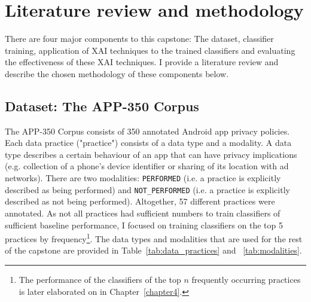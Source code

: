 \chapter{Literature review and methodology} %
\label{chapter2} %

\newcommand{\keyword}[1]{\textbf{#1}}
\newcommand{\tabhead}[1]{\textbf{#1}}
\newcommand{\code}[1]{\texttt{#1}}
\newcommand{\file}[1]{\texttt{\bfseries#1}}
\newcommand{\option}[1]{\texttt{\itshape#1}}


There are four major components to this capstone: The dataset, classifier training, application of XAI techniques to the trained classifiers and evaluating the effectiveness of these XAI techniques. I provide a literature review and describe the chosen methodology of these components below.

\section{Dataset: The APP-350 Corpus}
\label{app350_corpus}
The APP-350 Corpus consists of 350 annotated Android app privacy policies. Each data practice ("practice") consists of a data type and a modality. A data type describes a certain behaviour of an app that can have privacy implications (e.g. collection of a phone's device identifier or sharing of its location with ad networks). There are two modalities: \texttt{PERFORMED} (i.e. a practice is explicitly described as being performed) and \texttt{NOT\_PERFORMED} (i.e. a practice is explicitly described as not being performed). Altogether, 57 different practices were annotated. As not all practices had sufficient numbers to train classifiers of sufficient baseline performance, I focused on training classifiers on the top 5 practices by frequency\footnote{The performance of the classifiers of the top $n$ frequently occurring practices is later elaborated on in Chapter~\ref{chapter4}.}. The data types and modalities that are used for the rest of the capstone are provided in Table~\ref{tab:data_practices} and ~\ref{tab:modalities}.

